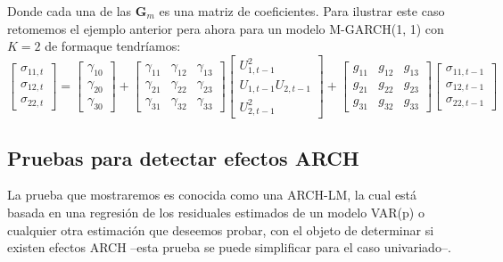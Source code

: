 \documentclass[
  a4paper,
]{article}
\begin{document}
Donde cada una de las \(\mathbf{G}_m\) es una matriz de coeficientes.
Para ilustrar este caso retomemos el ejemplo anterior pera ahora para un
modelo M-GARCH(1, 1) con \(K = 2\) de formaque tendríamos:
\begin{equation*}
    \begin{bmatrix}
    \sigma_{11, t} \\ \sigma_{12, t} \\ \sigma_{22, t}
    \end{bmatrix} =
    \begin{bmatrix}
    \gamma_{10} \\ \gamma_{20} \\ \gamma_{30}
    \end{bmatrix} +
    \begin{bmatrix}
    \gamma_{11} & \gamma_{12} & \gamma_{13} \\ \gamma_{21} & \gamma_{22} & \gamma_{23} \\ \gamma_{31} & \gamma_{32} & \gamma_{33}
    \end{bmatrix} 
    \begin{bmatrix}
    U^2_{1, t-1} \\ U_{1, t-1} U_{2, t-1} \\ U^2_{2, t-1}
    \end{bmatrix} +
    \begin{bmatrix}
    g_{11} & g_{12} & g_{13} \\ g_{21} & g_{22} & g_{23} \\ g_{31} & g_{32} & g_{33}
    \end{bmatrix} 
    \begin{bmatrix}
    \sigma_{11, t-1} \\ \sigma_{12, t-1} \\ \sigma_{22, t-1}
    \end{bmatrix}
\end{equation*}

\hypertarget{pruebas-para-detectar-efectos-arch}{%
\subsection{Pruebas para detectar efectos
ARCH}\label{pruebas-para-detectar-efectos-arch}}

La prueba que mostraremos es conocida como una ARCH-LM, la cual está
basada en una regresión de los residuales estimados de un modelo VAR(p)
o cualquier otra estimación que deseemos probar, con el objeto de
determinar si existen efectos ARCH --esta prueba se puede simplificar
para el caso univariado--.
\end{document}
